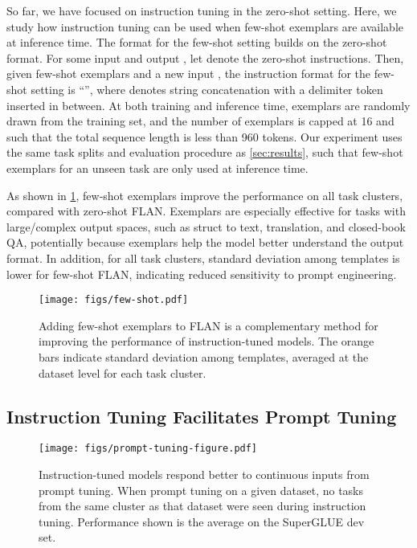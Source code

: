 \documentclass{article} \usepackage{iclr2022_conference,times}
\begin{document}
\newcommand{\instruct}{\textrm{instruct}}
So far, we have focused on instruction tuning in the zero-shot setting. 
Here, we study how instruction tuning can be used when few-shot exemplars are available at inference time.
The format for the few-shot setting builds on the zero-shot format. 
For some input  and output , let  denote the zero-shot instructions. 
Then, given  few-shot exemplars  and a new input , the instruction format for the few-shot setting is ``'', where  denotes string concatenation with a delimiter token inserted in between.
At both training and inference time, exemplars are randomly drawn from the training set, and the number of exemplars is capped at 16 and such that the total sequence length is less than 960 tokens. 
Our experiment uses the same task splits and evaluation procedure as \cref{sec:results}, such that few-shot exemplars for an unseen task are only used at inference time.

As shown in \cref{fig:few-shot}, few-shot exemplars improve the performance on all task clusters, compared with zero-shot FLAN. 
Exemplars are especially effective for tasks with large/complex output spaces, such as struct to text, translation, and closed-book QA, potentially because exemplars help the model better understand the output format. 
In addition, for all task clusters, standard deviation among templates is lower for few-shot FLAN, indicating reduced sensitivity to prompt engineering. 

\begin{figure}[h!]
    \centering
    \texttt{[image: figs/few-shot.pdf]}
    \vspace{-4mm}
    \caption{
    Adding few-shot exemplars to FLAN is a complementary method for improving the performance of instruction-tuned models.
    The orange bars indicate standard deviation among templates, averaged at the dataset level for each task cluster.
    }
    \label{fig:few-shot}
\end{figure}


\subsection{Instruction Tuning Facilitates Prompt Tuning}\label{subsec:prompt_tuning}

\begin{wrapfigure}{r}{0.33\textwidth}
    \centering
    \vspace{-10mm}
    \texttt{[image: figs/prompt-tuning-figure.pdf]}
    \vspace{-7mm}
    \caption{
    Instruction-tuned models respond better to continuous inputs from prompt tuning.
    When prompt tuning on a given dataset, no tasks from the same cluster as that dataset were seen during instruction tuning.
    Performance shown is the average on the SuperGLUE dev set.
    }
    \vspace{-3mm}
    \label{fig:prompt_tuning}
\end{wrapfigure}
\end{document}
